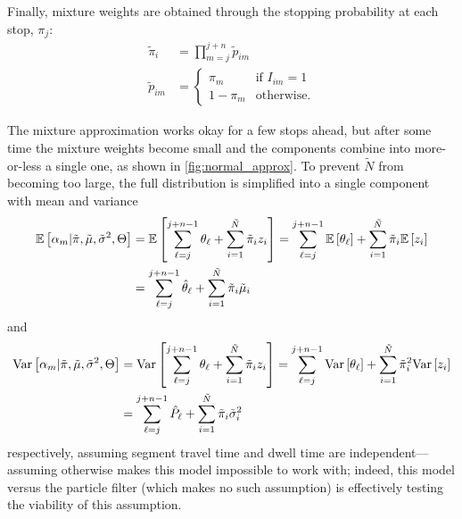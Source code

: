 Finally, mixture weights are obtained through the stopping probability at each stop, $\pi_j$:
\begin{equation}
\label{eq:ch5:mixture_weights}
\begin{split}
\tilde\pi_i &= \prod_{m=j}^{j+n} \tilde p_{im} \\
\tilde p_{im} &=
\begin{cases}
\pi_m & \text{if } I_{im} = 1 \\
1 - \pi_m & \text{otherwise.}
\end{cases}
\end{split}
\end{equation}


The mixture approximation works okay for a few stops ahead, but after some time the mixture weights become small and the components combine into more-or-less a single one, as shown in \cref{fig:normal_approx}. To prevent $\tilde N$ from becoming too large, the full distribution is simplified into a single component with mean and variance
\begin{equation}
\label{eq:mixture_mean}
\begin{split}
\mathbb{E}\left[\alpha_m | \tilde\pi, \tilde\mu, \tilde\sigma^2, \Theta\right] &=
\mathbb{E}\left[\sum_{\ell=j}^{j+n-1} \theta_\ell +
  \sum_{i=1}^{\tilde N} \tilde\pi_i z_i\right]
= \sum_{\ell=j}^{j+n-1} \mathbb{E}\left[\theta_\ell\right] +
  \sum_{i=1}^{\tilde N} \tilde\pi_i \mathbb{E}\left[z_i\right] \\
&= \sum_{\ell=j}^{j+n-1} \hat{\theta}_\ell +
  \sum_{i=1}^{\tilde N} \tilde\pi_i \tilde\mu_i
\end{split}
\end{equation}
and
\begin{equation}
\label{eq:mixture_variance}
\begin{split}
\mathrm{Var}\left[\alpha_m | \tilde\pi, \tilde\mu, \tilde\sigma^2, \Theta\right] &=
\mathrm{Var}\left[\sum_{\ell=j}^{j+n-1} \theta_\ell +
  \sum_{i=1}^{\tilde N} \tilde\pi_i z_i\right]
= \sum_{\ell=j}^{j+n-1} \mathrm{Var}\left[\theta_\ell\right] +
  \sum_{i=1}^{\tilde N} \tilde\pi_i^2 \mathrm{Var}\left[z_i\right] \\
&= \sum_{\ell=j}^{j+n-1} \hat{P}_\ell +
  \sum_{i=1}^{\tilde N} \tilde\pi_i \tilde\sigma_i^2
\end{split}
\end{equation}
respectively, assuming segment travel time and dwell time are independent---assuming otherwise makes this model impossible to work with; indeed, this model versus the particle filter (which makes no such assumption) is effectively testing the viability of this assumption.


